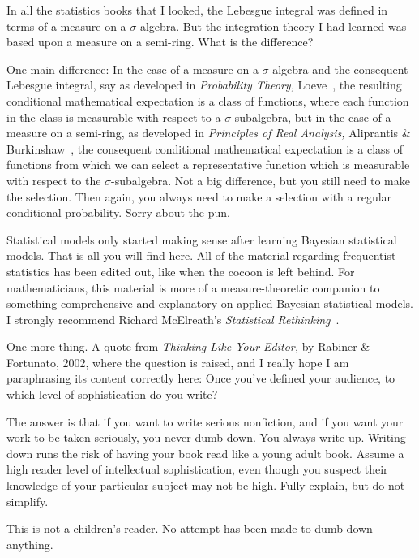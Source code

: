 \documentclass[
twoside=true,
paper=letter,
fontsize=9pt,
pagesize=auto,
leqno,
openany,
headsepline,
overfullrule,
]{scrbook}
\theoremstyle{plain}
\theoremstyle{plain}
\theoremstyle{definition}
\theoremstyle{bfnoteitalic}
\theoremstyle{bfnoteroman}
\newcommand{\textsigma}{\hbox{\large{$\sigma$}}\kern-1pt}
\begin{document}
In all  the statistics books that I looked, the Lebesgue integral was defined in terms of a measure on a  \textsigma\hyp{}algebra.
But the integration theory I had learned was based upon a measure on a  semi-ring.
What is the difference?

One main difference: In the case of a measure on a  \textsigma\hyp{}algebra and the consequent Lebesgue integral, say as developed in \textsl{Probability Theory,} Loeve~\cite{pt_loeve_1960}, the resulting conditional mathematical expectation is a class of functions, where each function in the class is measurable with respect to a
\textsigma\hyp{}subalgebra, but in the case of a measure on a semi-ring, as developed in
\textsl{Principles of Real Analysis,} Aliprantis \& Burkinshaw~\cite{pora_aliprantis_1990}, the consequent conditional mathematical expectation is a class of functions from which we can select a representative function which is measurable with respect to the  \textsigma\hyp{}subalgebra.  Not a big difference, but you still need to make the selection. Then again, you always need to make a selection with a regular conditional probability. Sorry about the pun.





Statistical models only started making sense after learning Bayesian statistical models.  That is all you will find here. All of the material regarding frequentist statistics has been edited out, like when the cocoon is left behind.
For mathematicians, this material is more of a measure-theoretic companion to something  comprehensive and explanatory on applied Bayesian statistical models.  I strongly recommend Richard McElreath's \textsl{Statistical Rethinking}~\cite{sr_mcelreath_2020}.


One more thing.
A quote from \textsl{Thinking Like Your Editor,} by Rabiner \& Fortunato, 2002, where the question is raised, and I really hope I am paraphrasing its content correctly here: Once you've defined your audience, to which level of sophistication do you write?
\begin{quoting}\small
The answer is that if you want to write serious nonfiction, and if you want your work to be taken seriously, you never dumb down. You always write up. Writing down runs the risk of having your book read like a young adult book. Assume a high reader level of intellectual sophistication, even though you suspect their knowledge of your particular subject may not be high.  Fully explain, but do not simplify.
\end{quoting}
This is not a children's reader.
No attempt has been made to dumb down anything.
\end{document}
